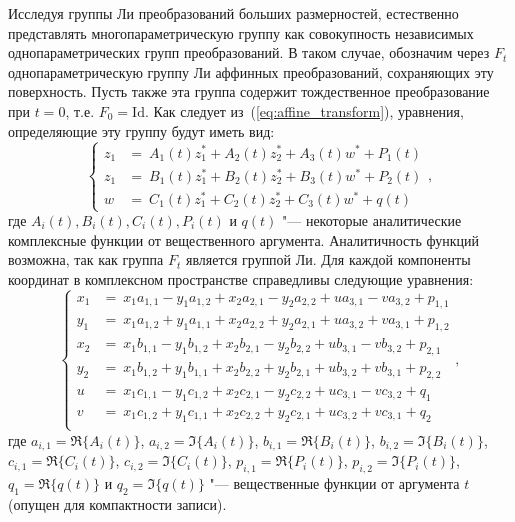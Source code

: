 \documentclass[../main.tex]{subfiles}
\begin{document}
Исследуя группы Ли преобразований больших размерностей, естественно представлять многопараметрическую группу как совокупность независимых однопараметрических групп преобразований. В таком случае, обозначим через $F_t$ однопараметрическую группу Ли аффинных преобразований, сохраняющих эту поверхность. Пусть также эта группа содержит тождественное преобразование при $t = 0$, т.е. $F_0 = \textrm{Id}$. Как следует из~(\ref{eq:affine_transform}), уравнения, определяющие эту группу будут иметь вид:
\begin{equation}
  \begin{cases}
     z_1 &=~A_{1}(t) z_1^* + A_{2}(t) z_2^* + A_{3}(t) w^* + P_1(t) \\
     z_1 &=~B_{1}(t) z_1^* + B_{2}(t) z_2^* + B_{3}(t) w^* + P_2(t) \\
     w   &=~C_{1}(t) z_1^* + C_{2}(t) z_2^* + C_{3}(t) w^* + q(t)
  \end{cases},
\end{equation}
где $A_{i}(t), B_{i}(t), C_{i}(t), P_i(t)$ и $q(t)$ "--- некоторые аналитические комплексные функции от вещественного аргумента. Аналитичность функций возможна, так как группа $F_t$ является группой Ли. Для каждой компоненты координат в комплексном пространстве справедливы следующие уравнения:
\begin{equation}\label{eq:coordinates_transform}
  \begin{cases}
     x_1 &=~x_1 a_{1,1} - y_1 a_{1,2} + x_2 a_{2,1} - y_2 a_{2,2} + u a_{3,1} - v a_{3,2} + p_{1,1}\\
     y_1 &=~x_1 a_{1,2} + y_1 a_{1,1} + x_2 a_{2,2} + y_2 a_{2,1} + u a_{3,2} + v a_{3,1} + p_{1,2}\\
     x_2 &=~x_1 b_{1,1} - y_1 b_{1,2} + x_2 b_{2,1} - y_2 b_{2,2} + u b_{3,1} - v b_{3,2} + p_{2,1}\\
     y_2 &=~x_1 b_{1,2} + y_1 b_{1,1} + x_2 b_{2,2} + y_2 b_{2,1} + u b_{3,2} + v b_{3,1} + p_{2,2}\\
     u   &=~x_1 c_{1,1} - y_1 c_{1,2} + x_2 c_{2,1} - y_2 c_{2,2} + u c_{3,1} - v c_{3,2} + q_1\\
     v   &=~x_1 c_{1,2} + y_1 c_{1,1} + x_2 c_{2,2} + y_2 c_{2,1} + u c_{3,2} + v c_{3,1} + q_2\\
  \end{cases},
\end{equation}
где $a_{i, 1} = \Re\{A_i(t)\}$, $a_{i, 2} = \Im\{A_i(t)\}$, $b_{i, 1} = \Re\{B_i(t)\}$, $b_{i, 2} = \Im\{B_i(t)\}$, $c_{i, 1} = \Re\{C_i(t)\}$, $c_{i, 2} = \Im\{C_i(t)\}$, $p_{i, 1} = \Re\{P_i(t)\}$, $p_{i, 2} = \Im\{P_i(t)\}$, $q_1 = \Re\{q(t)\}$ и $q_2 = \Im\{q(t)\}$ "--- вещественные функции от аргумента $t$ (опущен для компактности записи).
\end{document}
